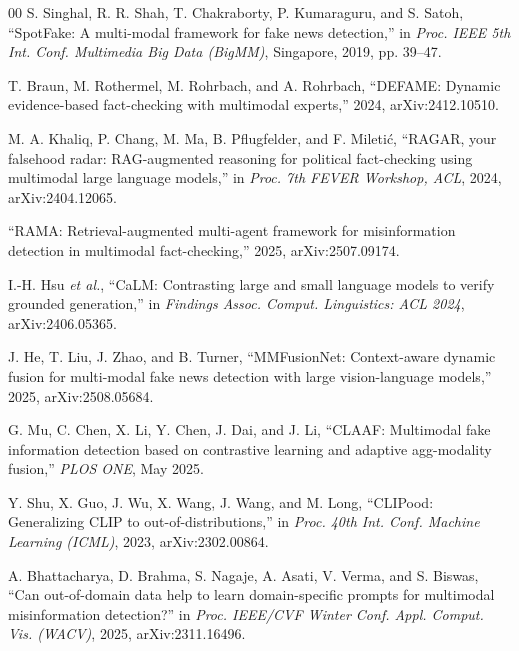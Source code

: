 \documentclass[conference,a4paper]{IEEEtran}
\newif\ifdraftnotes
\begin{document}
\begin{thebibliography}{00}
 S. Singhal, R. R. Shah, T. Chakraborty, P. Kumaraguru, and
S. Satoh, ``SpotFake: A multi-modal framework for fake news detection,'' in
\emph{Proc. IEEE 5th Int. Conf. Multimedia Big Data (BigMM)}, Singapore, 2019,
pp. 39--47.

 T. Braun, M. Rothermel, M. Rohrbach, and A. Rohrbach,
``DEFAME: Dynamic evidence-based fact-checking with multimodal experts,''
2024, arXiv:2412.10510.

 M. A. Khaliq, P. Chang, M. Ma, B. Pflugfelder, and
F. Mileti\'{c}, ``RAGAR, your falsehood radar: RAG-augmented reasoning for
political fact-checking using multimodal large language models,'' in
\emph{Proc. 7th FEVER Workshop, ACL}, 2024, arXiv:2404.12065.

 ``RAMA: Retrieval-augmented multi-agent framework for
misinformation detection in multimodal fact-checking,'' 2025,
arXiv:2507.09174.
\ifdraftnotes\\\emph{\footnotesize [DRAFT NOTE -- REMOVE BEFORE SUBMISSION]
Author list not independently confirmed; verify against the arXiv record.}\fi

 I.-H. Hsu \emph{et al.}, ``CaLM: Contrasting large and small
language models to verify grounded generation,'' in \emph{Findings Assoc.
Comput. Linguistics: ACL 2024}, arXiv:2406.05365.

 J. He, T. Liu, J. Zhao, and B. Turner,
``MMFusionNet: Context-aware dynamic fusion for multi-modal fake news
detection with large vision-language models,'' 2025, arXiv:2508.05684.

 G. Mu, C. Chen, X. Li, Y. Chen, J. Dai, and J. Li,
``CLAAF: Multimodal fake information detection based on contrastive learning
and adaptive agg-modality fusion,'' \emph{PLOS ONE}, May 2025.

 Y. Shu, X. Guo, J. Wu, X. Wang, J. Wang, and M. Long,
``CLIPood: Generalizing CLIP to out-of-distributions,'' in \emph{Proc. 40th
Int. Conf. Machine Learning (ICML)}, 2023, arXiv:2302.00864.

 A. Bhattacharya, D. Brahma, S. Nagaje, A. Asati, V. Verma, and
S. Biswas, ``Can out-of-domain data help to learn domain-specific prompts for
multimodal misinformation detection?'' in \emph{Proc. IEEE/CVF Winter Conf.
Appl. Comput. Vis. (WACV)}, 2025, arXiv:2311.16496.

\end{thebibliography}
\end{document}
